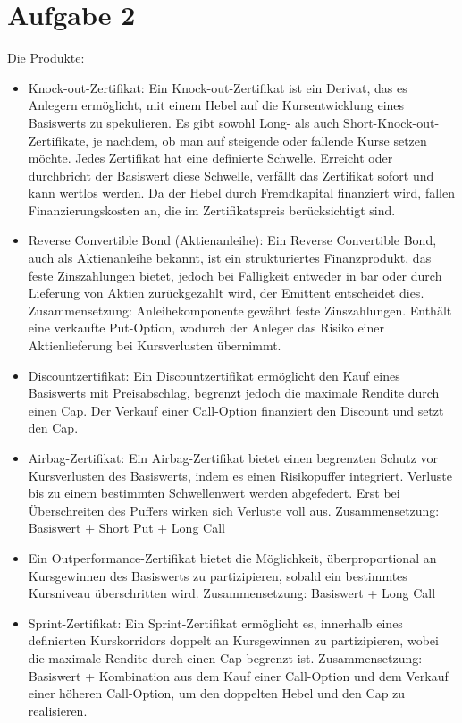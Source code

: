 \documentclass{article}
\begin{document}
	\section*{Aufgabe 2}
	
	Die Produkte:
	\begin{itemize}
		\item Knock-out-Zertifikat: Ein Knock-out-Zertifikat ist ein Derivat, das es Anlegern ermöglicht, mit einem Hebel auf die Kursentwicklung eines Basiswerts zu spekulieren. Es gibt sowohl Long- als auch Short-Knock-out-Zertifikate, je nachdem, ob man auf steigende oder fallende Kurse setzen möchte. Jedes Zertifikat hat eine definierte Schwelle. Erreicht oder durchbricht der Basiswert diese Schwelle, verfällt das Zertifikat sofort und kann wertlos werden. Da der Hebel durch Fremdkapital finanziert wird, fallen Finanzierungskosten an, die im Zertifikatspreis berücksichtigt sind.
		\item Reverse Convertible Bond (Aktienanleihe): Ein Reverse Convertible Bond, auch als Aktienanleihe bekannt, ist ein strukturiertes Finanzprodukt, das feste Zinszahlungen bietet, jedoch bei Fälligkeit entweder in bar oder durch Lieferung von Aktien zurückgezahlt wird, der Emittent entscheidet dies.
		Zusammensetzung: Anleihekomponente gewährt feste Zinszahlungen. Enthält eine verkaufte Put-Option, wodurch der Anleger das Risiko einer Aktienlieferung bei Kursverlusten übernimmt.
		\item Discountzertifikat: Ein Discountzertifikat ermöglicht den Kauf eines Basiswerts mit Preisabschlag, begrenzt jedoch die maximale Rendite durch einen Cap. Der Verkauf einer Call-Option finanziert den Discount und setzt den Cap.
		\item Airbag-Zertifikat: Ein Airbag-Zertifikat bietet einen begrenzten Schutz vor Kursverlusten des Basiswerts, indem es einen Risikopuffer integriert. Verluste bis zu einem bestimmten Schwellenwert werden abgefedert. Erst bei Überschreiten des Puffers wirken sich Verluste voll aus. Zusammensetzung: Basiswert + Short Put + Long Call
		\item Ein Outperformance-Zertifikat bietet die Möglichkeit, überproportional an Kursgewinnen des Basiswerts zu partizipieren, sobald ein bestimmtes Kursniveau überschritten wird. Zusammensetzung: Basiswert + Long Call
		\item Sprint-Zertifikat: Ein Sprint-Zertifikat ermöglicht es, innerhalb eines definierten Kurskorridors doppelt an Kursgewinnen zu partizipieren, wobei die maximale Rendite durch einen Cap begrenzt ist. Zusammensetzung: Basiswert + Kombination aus dem Kauf einer Call-Option und dem Verkauf einer höheren Call-Option, um den doppelten Hebel und den Cap zu realisieren.
	\end{itemize}
	
\end{document}
